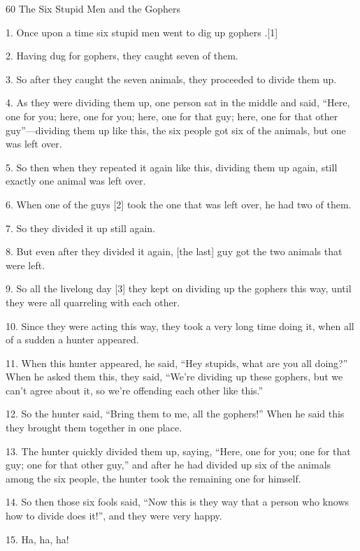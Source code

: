 
{\LARGE{}60 The Six Stupid Men and the Gophers}

{\LARGE{}1. Once upon a time six stupid men went to dig up gophers .[1]}

{\LARGE{}2. Having dug for gophers, they caught seven of them.}

{\LARGE{}3. So after they caught the seven animals, they proceeded to divide them
up.}

{\LARGE{}4. As they were dividing them up, one person sat in the middle and said,
``Here, one for you; here, one for you; here, one for that guy; here, one for that
other guy''---dividing them up like this, the six people got six of the animals,
but one was left over.}

{\LARGE{}5. So then when they repeated it again like this, dividing them up again,
still exactly one animal was left over.}

{\LARGE{}6. When one of the guys [2] took the one that was left over, he had two
of them.}

{\LARGE{}7. So they divided it up still again.}

{\LARGE{}8. But even after they divided it again, [the last] guy got the two animals
that were left.}

{\LARGE{}9. So all the livelong day [3] they kept on dividing up the gophers this
way, until they were all quarreling with each other.}

{\LARGE{}10. Since they were acting this way, they took a very long time doing
it, when all of a sudden a hunter appeared.}

{\LARGE{}11. When this hunter appeared, he said, ``Hey stupids, what are you all
doing?'' When he asked them this, they said, ``We're dividing up these gophers,
but we can't agree about it, so we're offending each other like this.''}

{\LARGE{}12. So the hunter said, ``Bring them to me, all the gophers!'' When he
said this they brought them together in one place.}

{\LARGE{}13. The hunter quickly divided them up, saying, ``Here, one for you; one
for that guy; one for that other guy,'' and after he had divided up six of the
animals among the six people, the hunter took the remaining one for himself.}

{\LARGE{}14. So then those six fools said, ``Now this is they way that a person
who knows how to divide does it!'', and they were very happy.}

{\LARGE{}15. Ha, ha, ha!}

